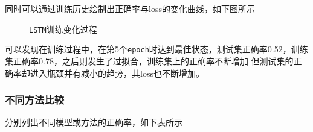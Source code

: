 \documentclass[UTF8]{ctexart}
\begin{document}
同时可以通过训练历史绘制出正确率与loss的变化曲线，如下图所示

\begin{figure}[htb]
    \centering
    \caption{\lstinline{LSTM}训练变化过程}
\end{figure}

可以发现在训练过程中，在第5个\lstinline{epoch}时达到最佳状态，测试集正确率0.52，训练集正确率0.78，之后则发生了过拟合，训练集上的正确率不断增加
但测试集的正确率却进入瓶颈并有减小的趋势，其loss也不断增加。
\newpage
\subsubsection{不同方法比较}

分别列出不同模型或方法的正确率，如下表所示
\end{document}
